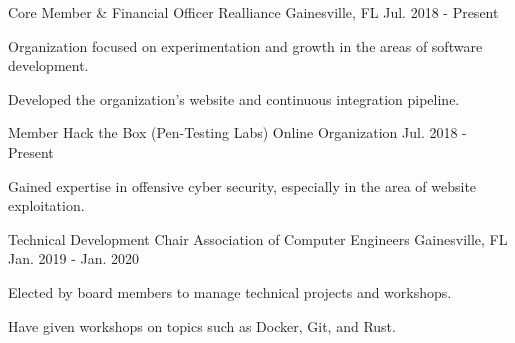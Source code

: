 \begin{cventries}
  \cventry
    {Core Member \& Financial Officer}
    {Realliance}
    {Gainesville, FL}
    {Jul. 2018 - Present}
    {
      \begin{cvitems}
        \item {Organization focused on experimentation and growth in the areas of software development.}
        \item {Developed the organization's website and continuous integration pipeline.}
      \end{cvitems}
    }
  \cventry
    {Member}
    {Hack the Box (Pen-Testing Labs)}
    {Online Organization}
    {Jul. 2018 - Present}
    {
      \begin{cvitems}
        \item {Gained expertise in offensive cyber security, especially in the area of website exploitation.}
      \end{cvitems}
    }
  \cventry
    {Technical Development Chair}
    {Association of Computer Engineers}
    {Gainesville, FL}
    {Jan. 2019 - Jan. 2020}
    {
      \begin{cvitems}
        \item {Elected by board members to manage technical projects and workshops.}
        \item {Have given workshops on topics such as Docker, Git, and Rust.}
      \end{cvitems}
    }
\end{cventries}
